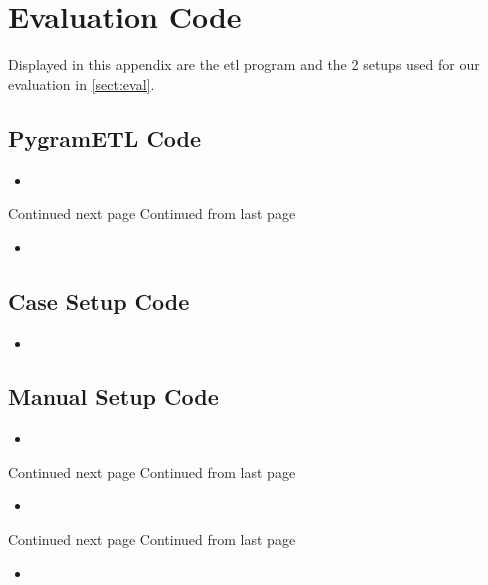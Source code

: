 \clearpage
\onecolumn
\appendix
\section{Evaluation Code}
Displayed in this appendix are the etl program and the 2 setups used for our evaluation in \cref{sect:eval}.

\subsection{PygramETL Code}

\begin{itemize}
\item[]
\end{itemize}
Continued next page
\clearpage
Continued from last page
\begin{itemize}
\item[]
\end{itemize}


\subsection{Case Setup Code}
\begin{itemize}
\item[]
\end{itemize}

\clearpage
\subsection{Manual Setup Code}
\begin{itemize}
\item[]
\end{itemize}
Continued next page
\clearpage
Continued from last page
\begin{itemize}
\item[]
\end{itemize}
Continued next page
\clearpage
Continued from last page
\begin{itemize}
\item[]
\end{itemize}

